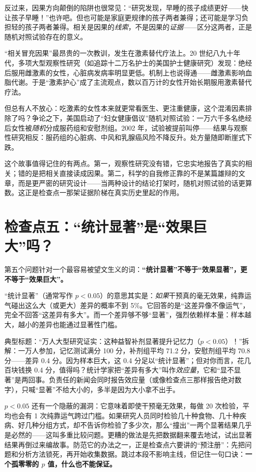 反过来，因果方向颠倒的陷阱也很常见：“研究发现，早睡的孩子成绩更好——快让孩子早睡！”也许吧。但也可能是家庭更规律的孩子两者兼得；还可能是学习负担轻的孩子两者兼得。相关是因果的\emph{线索}，不是因果的\emph{证据}——区分这两者，正是随机对照试验存在的意义。

\begin{zhengju}
“相关冒充因果”最昂贵的一次教训，发生在激素替代疗法上。20 世纪八九十年代，多项大型观察性研究（如追踪十二万名护士的美国护士健康研究）发现：绝经后服用雌激素的女性，心脏病发病率明显更低。机制上也说得通——雌激素影响血脂代谢。于是“激素护心”成了主流观点，数以百万计的女性开始长期服用激素替代疗法。

但总有人不放心：吃激素的女性本来就更常看医生、更注重健康，这个混淆因素排除了吗？争论之下，美国启动了“妇女健康倡议”随机对照试验：一万六千多名绝经后女性被\emph{随机}分成服药组和安慰剂组。2002 年，试验被提前叫停——结果与观察性研究相反：服药组的心脏病、中风和乳腺癌风险不降反升。处方量随即断崖式下跌。

这个故事值得记住的有两点。第一，观察性研究没有错，它忠实地报告了真实的相关；错的是把相关直接读成因果。第二，科学的自我修正靠的不是某篇雄辩的文章，而是更严密的研究设计——当两种设计的结论打架时，随机对照试验的话更算数。这正是检查点一那架证据阶梯在真实历史里起的作用。
\end{zhengju}

\section{检查点五：“统计显著”是“效果巨大”吗？}

第五个问题针对一个最容易被望文生义的词：\textbf{“统计显著”不等于“效果显著”，更不等于“效果巨大”。}

“统计显著”（通常写作 $p<0.05$）的意思其实是：\emph{如果}干预真的毫无效果，纯靠运气碰出这么大（或更大）差异的概率不到 5\%。它回答的是“这差异像不像运气”，完全不回答“这差异有多大”。而一个差异够不够“显著”，强烈依赖样本量：样本越大，越小的差异也能通过显著性门槛。

典型标题：“万人大型研究证实：这种益智补剂显著提升记忆力（$p<0.05$）！”拆解：一万人参加，记忆测试满分 100 分，补剂组平均 71.2 分，安慰剂组平均 70.8 分——差异 0.4 分。因为样本巨大，这 0.4 分足以“统计显著”；但对你而言，花几百块钱换 0.4 分，值得吗？统计学家把“差异有多大”叫作\emph{效应量}，它和“显不显著”是两回事。负责任的新闻会同时报告效应量（或像检查点三那样报告绝对数字），只喊“显著”不给大小的，多半是因为大小拿不出手。

\begin{tiaozhan}
$p<0.05$ 还有一个隐蔽的漏洞：它意味着即使干预毫无效果，每做 20 次检验，平均也会有 1 次纯靠运气跨过门槛。如果研究人员同时检验几十种食物、几十种疾病、好几种分组方式，却不告诉你检验了多少次，那么“撞出”一两个显著结果几乎是必然的——这叫多重比较问题。更糟的做法是先把数据翻来覆去地试，试出显著结果再倒过来编故事。防范它的办法之一，正是检查点六要讲的“预注册”：先把问题和分析方法锁死，再开始收集数据。跳过本段不影响主线，但记住一句口诀：\textbf{一个孤零零的 $p$ 值，什么也不能保证。}
\end{tiaozhan}

